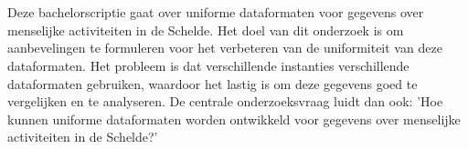 
%
%
%
%
%

%



\chapter*{}

Deze bachelorscriptie gaat over uniforme dataformaten voor gegevens over menselijke activiteiten in de Schelde. Het doel van dit onderzoek is om aanbevelingen te formuleren voor het verbeteren van de uniformiteit van deze dataformaten. Het probleem is dat verschillende instanties verschillende dataformaten gebruiken, waardoor het lastig is om deze gegevens goed te vergelijken en te analyseren. De centrale onderzoeksvraag luidt dan ook: 'Hoe kunnen uniforme dataformaten worden ontwikkeld voor gegevens over menselijke activiteiten in de Schelde?'

